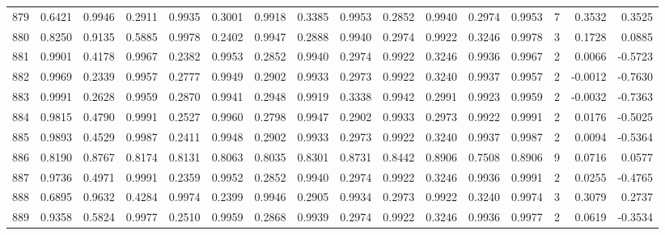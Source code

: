 \begin{tabular}{lrrrrrrrrrrrrrrr}
879 &      0.6421 &  0.9946 &  0.2911 &  0.9935 &  0.3001 &  0.9918 &  0.3385 &  0.9953 &  0.2852 &  0.9940 &   0.2974 &     0.9953 &      7 &                    0.3532 &                     0.3525 \\
880 &      0.8250 &  0.9135 &  0.5885 &  0.9978 &  0.2402 &  0.9947 &  0.2888 &  0.9940 &  0.2974 &  0.9922 &   0.3246 &     0.9978 &      3 &                    0.1728 &                     0.0885 \\
881 &      0.9901 &  0.4178 &  0.9967 &  0.2382 &  0.9953 &  0.2852 &  0.9940 &  0.2974 &  0.9922 &  0.3246 &   0.9936 &     0.9967 &      2 &                    0.0066 &                    -0.5723 \\
882 &      0.9969 &  0.2339 &  0.9957 &  0.2777 &  0.9949 &  0.2902 &  0.9933 &  0.2973 &  0.9922 &  0.3240 &   0.9937 &     0.9957 &      2 &                   -0.0012 &                    -0.7630 \\
883 &      0.9991 &  0.2628 &  0.9959 &  0.2870 &  0.9941 &  0.2948 &  0.9919 &  0.3338 &  0.9942 &  0.2991 &   0.9923 &     0.9959 &      2 &                   -0.0032 &                    -0.7363 \\
884 &      0.9815 &  0.4790 &  0.9991 &  0.2527 &  0.9960 &  0.2798 &  0.9947 &  0.2902 &  0.9933 &  0.2973 &   0.9922 &     0.9991 &      2 &                    0.0176 &                    -0.5025 \\
885 &      0.9893 &  0.4529 &  0.9987 &  0.2411 &  0.9948 &  0.2902 &  0.9933 &  0.2973 &  0.9922 &  0.3240 &   0.9937 &     0.9987 &      2 &                    0.0094 &                    -0.5364 \\
886 &      0.8190 &  0.8767 &  0.8174 &  0.8131 &  0.8063 &  0.8035 &  0.8301 &  0.8731 &  0.8442 &  0.8906 &   0.7508 &     0.8906 &      9 &                    0.0716 &                     0.0577 \\
887 &      0.9736 &  0.4971 &  0.9991 &  0.2359 &  0.9952 &  0.2852 &  0.9940 &  0.2974 &  0.9922 &  0.3246 &   0.9936 &     0.9991 &      2 &                    0.0255 &                    -0.4765 \\
888 &      0.6895 &  0.9632 &  0.4284 &  0.9974 &  0.2399 &  0.9946 &  0.2905 &  0.9934 &  0.2973 &  0.9922 &   0.3240 &     0.9974 &      3 &                    0.3079 &                     0.2737 \\
889 &      0.9358 &  0.5824 &  0.9977 &  0.2510 &  0.9959 &  0.2868 &  0.9939 &  0.2974 &  0.9922 &  0.3246 &   0.9936 &     0.9977 &      2 &                    0.0619 &                    -0.3534 \\

\end{tabular}
